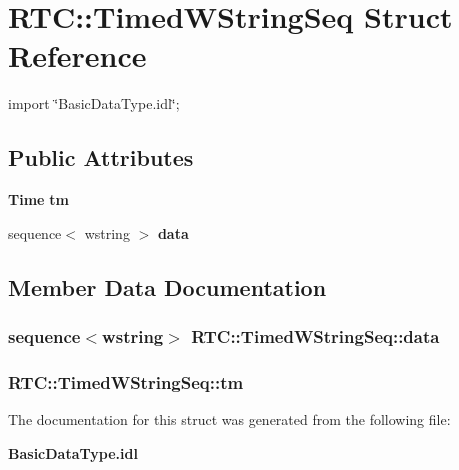 \section{RTC::TimedWStringSeq Struct Reference}
\label{structRTC_1_1TimedWStringSeq}


{\ttfamily import \char`\"{}BasicDataType.idl\char`\"{};}

\subsection*{Public Attributes}
\begin{DoxyCompactItemize}
\item 
{\bf Time} {\bf tm}
\item 
sequence$<$ wstring $>$ {\bf data}
\end{DoxyCompactItemize}


\subsection{Member Data Documentation}
\subsubsection[{data}]{\setlength{\rightskip}{0pt plus 5cm}sequence$<$wstring$>$ {\bf RTC::TimedWStringSeq::data}}\label{structRTC_1_1TimedWStringSeq_a01c8e9111a22f9656ba46638270282f2}
\subsubsection[{tm}]{ {\bf RTC::TimedWStringSeq::tm}}\label{structRTC_1_1TimedWStringSeq_a33d7df9ff47c8c5288729bebec480985}


The documentation for this struct was generated from the following file:\begin{DoxyCompactItemize}
\item 
{\bf BasicDataType.idl}\end{DoxyCompactItemize}
